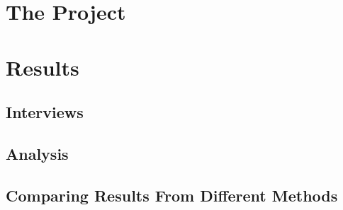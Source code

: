 \documentclass[a4paper,english]{ifimaster}
\begin{document}
\chapter{The Project}

\chapter{Results}
\section{Interviews}
\section{Analysis}
\section{Comparing Results From Different Methods}


\backmatter{}
\printbibliography{}
\end{document}
